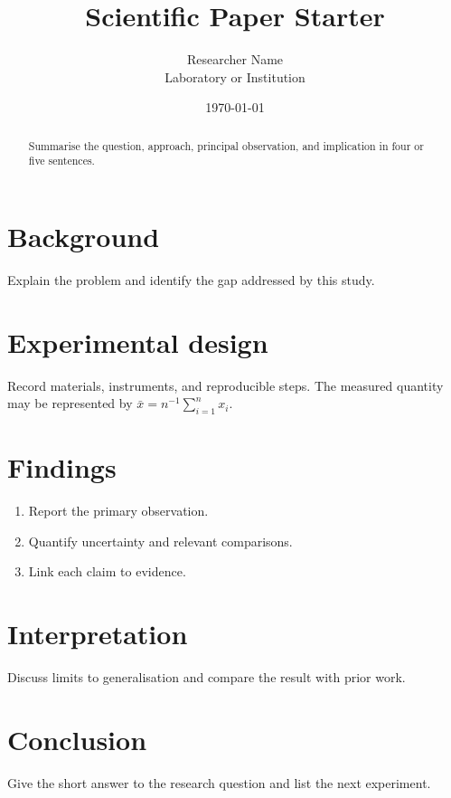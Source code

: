 \documentclass[11pt]{article}
\title{Scientific Paper Starter}
\author{Researcher Name\\Laboratory or Institution}
\date{\today}
\begin{document}
\maketitle
\begin{abstract}Summarise the question, approach, principal observation, and implication in four or five sentences.\end{abstract}
\section{Background}
Explain the problem and identify the gap addressed by this study.\section{Experimental design}
Record materials, instruments, and reproducible steps. The measured quantity may be represented by $\bar{x}=n^{-1}\sum_{i=1}^{n}x_i$.
\section{Findings}
\begin{enumerate}\item Report the primary observation.\item Quantify uncertainty and relevant comparisons.\item Link each claim to evidence.\end{enumerate}
\section{Interpretation}
Discuss limits to generalisation and compare the result with prior work.\section{Conclusion}
Give the short answer to the research question and list the next experiment.
\end{document}
